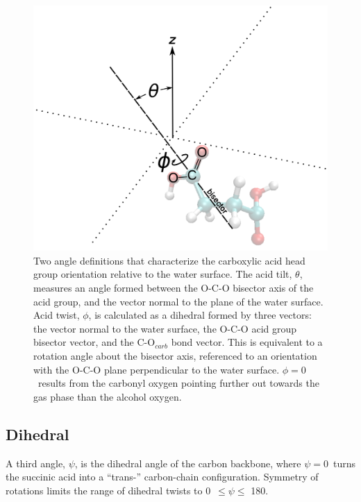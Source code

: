 \begin{figure}[h!]
	\begin{center}
		\includegraphics[scale=1.0]{images/bond-angles/bond-angle-definitions-small.png}
		\caption{Two angle definitions that characterize the carboxylic acid head group orientation relative to the water surface. The acid tilt, $\theta$, measures an angle formed between the O-C-O bisector axis of the acid group, and the vector normal to the plane of the water surface. Acid twist, $\phi$, is calculated as a dihedral formed by three vectors: the vector normal to the water surface, the O-C-O acid group bisector vector, and the C-O$_{carb}$ bond vector. This is equivalent to a rotation angle about the bisector axis, referenced to an orientation with the O-C-O plane perpendicular to the water surface. $\phi = 0$\textdegree~results from the carbonyl oxygen pointing further out towards the gas phase than the alcohol oxygen.}
		\label{fig:angle-definitions}
	\end{center}
\end{figure}

\subsection*{Dihedral}

A third angle, $\psi$, is the dihedral angle of the carbon backbone, where $\psi = 0$\textdegree~turns the succinic acid into a ``trans-'' carbon-chain configuration. Symmetry of rotations limits the range of dihedral twists to 0\textdegree~$\le \psi \le$ 180\textdegree.

